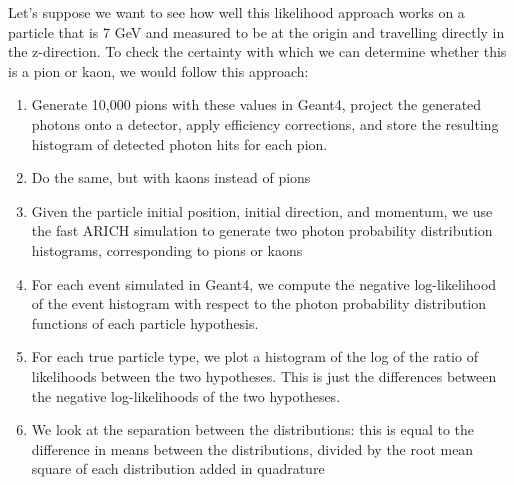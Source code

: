 Let's suppose we want to see how well this likelihood approach works on a particle that is 7 GeV and measured to be at the origin and travelling directly in the z-direction.
To check the certainty with which we can determine whether this is a pion or kaon, we would follow this approach:

\begin{enumerate}
\item Generate 10,000 pions with these values in Geant4, project the generated photons onto a detector, apply efficiency corrections, and store the resulting histogram of detected photon hits for each pion. 
\item Do the same, but with kaons instead of pions
\item Given the particle initial position, initial direction, and momentum, we use the fast ARICH simulation to generate two photon probability distribution histograms, corresponding to pions or kaons
\item For each event simulated in Geant4, we compute the negative log-likelihood of the event histogram with respect to the photon probability distribution functions of each particle hypothesis.
\item For each true particle type, we plot a histogram of the log of the ratio of likelihoods between the two hypotheses.
This is just the differences between the negative log-likelihoods of the two hypotheses.
\item We look at the separation between the distributions: this is equal to the difference in means between the distributions, divided by the root mean square of each distribution added in quadrature
\end{enumerate}

